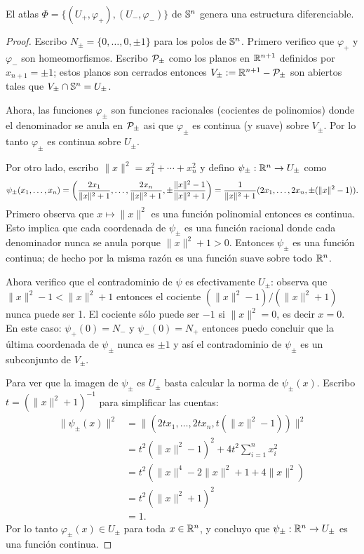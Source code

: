 \begin{ejercicio}\label{ej:17}
  El atlas $\Phi=\{(U_+,\varphi_+),(U_-,\varphi_-)\}$ de $\mathbb{S}^n$ genera una estructura diferenciable.
\end{ejercicio}

\begin{proof}%
  Escribo $N_{\pm}=\{0,\ldots,0,\pm 1\}$ para los polos de $\mathbb{S}^n$. Primero verifico que $\varphi_+$
  y $\varphi_-$ son homeomorfismos. Escribo $\mathcal{P}_{\pm}$ como los planos en $\mathbb{R}^{n+1}$ definidos por
  $x_{n+1}=\pm 1$; estos planos son cerrados entonces $V_{\pm}:=\mathbb{R}^{n+1}-\mathcal{P}_{\pm}$ son abiertos tales
  que $V_{\pm}\cap\mathbb{S}^n=U_{\pm}$.

  Ahora, las funciones $\varphi_{\pm}$ son funciones racionales
  (cocientes de polinomios) donde el denominador se anula en $\mathcal{P}_{\pm}$ asi que $\varphi_{\pm}$ es
  continua (y suave) sobre $V_{\pm}$. Por lo tanto $\varphi_{\pm}$ es continua sobre $U_{\pm}$.

  Por otro lado, escribo $\|x\|^2=x_1^2+\cdots+x_n^2$ y defino $\psi_{\pm}:\mathbb{R}^n\rightarrow U_{\pm}$ como
  \[
    \psi_{\pm}(x_1,\ldots,x_n)=
    \left( \frac{2x_1}{\|x\|^2+1},\ldots,\frac{2x_n}{\|x\|^2+1},\pm\frac{\|x\|^2-1}{\|x\|^2+1} \right)=
    \frac{1}{\|x\|^2+1}(2x_1,\ldots,2x_n,\pm(\|x\|^2-1)).
  \]
  Primero observa que $x\mapsto\|x\|^2$ es una funci\'on polinomial entonces es continua. Esto
  implica que cada coordenada de $\psi_{\pm}$ es una funci\'on racional donde cada denominador
  nunca se anula porque $\|x\|^2+1>0$. Entonces $\psi_{\pm}$ es una funci\'on continua; de hecho
  por la misma raz\'on es una funci\'on suave sobre todo $\mathbb{R}^n$.

  Ahora verifico que el contradominio de $\psi$ es efectivamente $U_{\pm}$: observa que
  $\|x\|^2-1<\|x\|^2+1$ entonces el cociente $(\|x\|^2-1)/(\|x\|^2+1)$ nunca puede ser 1.
  El cociente s\'olo puede ser $-1$ si $\|x\|^2=0$, es decir $x=0$. En este caso:
  $\psi_+(0)=N_-$ y $\psi_-(0)=N_+$ entonces puedo concluir que la \'ultima coordenada de $\psi_{\pm}$
  nunca es $\pm 1$ y as\'i el contradominio de $\psi_{\pm}$ es un subconjunto de $V_{\pm}$.

  Para ver que la imagen de $\psi_{\pm}$ es $U_{\pm}$ basta calcular la norma de $\psi_{\pm}(x)$.
  Escribo $t=(\|x\|^2+1)^{-1}$ para simplificar las cuentas:
  \begin{align*}
    \|\psi_{\pm}(x)\|^2& =
    \lVert (2tx_1,\ldots,2tx_n,t(\|x\|^2-1))  \rVert^2 \\ & =
    t^2(\|x\|^2-1)^2+4t^2\sum_{i=1}^nx_i^2\\ & =
    t^2(\|x\|^4-2\|x\|^2+1+4\|x\|^2)\\ & =
    t^2(\|x\|^2+1)^2\\ & =
    1.
  \end{align*}
  Por lo tanto $\varphi_{\pm}(x)\in U_{\pm}$ para toda $x\in\mathbb{R}^n$, y concluyo que
  $\psi_{\pm}:\mathbb{R}^n\rightarrow U_{\pm}$ es una funci\'on continua.


\end{proof}
